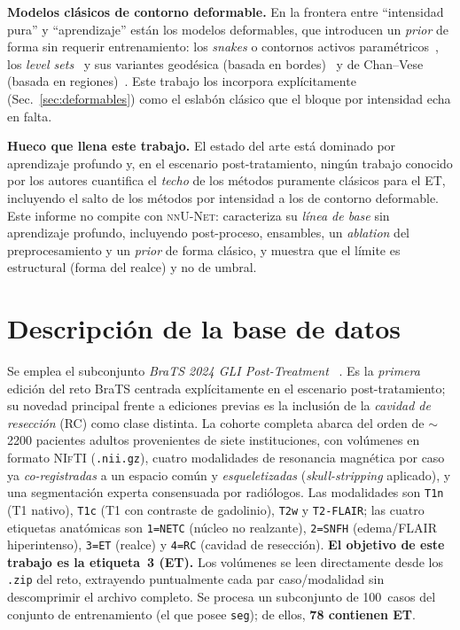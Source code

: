 \documentclass[conference]{IEEEtran}
\begin{document}
\textbf{Modelos clásicos de contorno deformable.} En la frontera entre
``intensidad pura'' y ``aprendizaje'' están los modelos deformables, que
introducen un \emph{prior} de forma sin requerir entrenamiento: los
\textit{snakes} o contornos activos paramétricos~\cite{kass1988snakes}, los
\emph{level sets}~\cite{osher1988fronts} y sus variantes geodésica
(basada en bordes)~\cite{caselles1997geodesic} y de
Chan--Vese (basada en regiones)~\cite{chan2001active}. Este trabajo los
incorpora explícitamente (Sec.~\ref{sec:deformables}) como el eslabón
clásico que el bloque por intensidad echa en falta.

\textbf{Hueco que llena este trabajo.} El estado del arte está
dominado por aprendizaje profundo y, en el escenario
post-tratamiento, ningún trabajo conocido por los autores cuantifica
el \emph{techo} de los métodos puramente clásicos para el ET,
incluyendo el salto de los métodos por intensidad a los de contorno
deformable. Este informe no compite con \textsc{nnU-Net}:
caracteriza su \emph{línea de base} sin aprendizaje profundo,
incluyendo post-proceso, ensambles, un \emph{ablation} del
preprocesamiento y un \emph{prior} de forma clásico, y muestra que el
límite es estructural (forma del realce) y no de umbral.

\section{Descripción de la base de datos}
\label{sec:datos}
Se emplea el subconjunto \textit{BraTS 2024 GLI Post-Treatment}
~\cite{deverdier2024brats}. Es la \emph{primera} edición del reto
BraTS centrada explícitamente en el escenario post-tratamiento;
su novedad principal frente a ediciones previas es la inclusión
de la \emph{cavidad de resección} (RC) como clase distinta. La
cohorte completa abarca del orden de $\sim$2200 pacientes
adultos provenientes de siete instituciones, con volúmenes en
formato \textsc{NIfTI} (\texttt{.nii.gz}), cuatro modalidades de
resonancia magnética por caso ya \emph{co-registradas} a un
espacio común y \emph{esqueletizadas} (\textit{skull-stripping}
aplicado), y una segmentación experta consensuada por
radiólogos. Las modalidades son \texttt{T1n} (T1 nativo),
\texttt{T1c} (T1 con contraste de gadolinio), \texttt{T2w} y
\texttt{T2-FLAIR}; las cuatro etiquetas anatómicas son
\texttt{1=NETC} (núcleo no realzante), \texttt{2=SNFH}
(edema/FLAIR hiperintenso), \texttt{3=ET} (realce) y \texttt{4=RC}
(cavidad de resección). \textbf{El objetivo de este trabajo es la
etiqueta~3 (ET).} Los volúmenes se leen directamente desde los
\texttt{.zip} del reto, extrayendo puntualmente cada par
caso/modalidad sin descomprimir el archivo completo. Se procesa un
subconjunto de 100~casos del conjunto de entrenamiento (el que
posee \texttt{seg}); de ellos, \textbf{78 contienen ET}.
\end{document}
